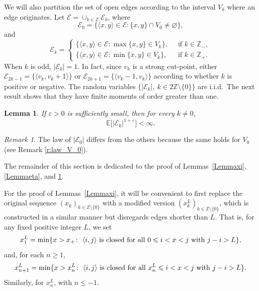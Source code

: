 \documentclass[a4paper,oneside,12pt]{amsart}
\renewcommand{\leq}{\leqslant}
\renewcommand{\geq}{\geqslant}
\newcommand{\E}{\mathbb{E}}
\theoremstyle{plain}
\newtheorem{lemma}{Lemma}
\theoremstyle{definition}
\theoremstyle{remark}
\newtheorem{remark}{Remark}
\newcommand{\Z}{{\mathbb{Z}}}
\begin{document}
We will also partition the set of open edges according to the interval $V_k$ where an edge originates.
Let $\mathcal{E} = \cup_{k \in \Z} \mathcal{E}_{k}$, where 
\[
\mathcal{E}_0 = \big\{ \langle x,y \rangle \in \mathcal{E} \colon \{x,y\} \cap V_0 \neq \varnothing \big\},
\]
and
\begin{equation*}
\mathcal{E}_{k} = \begin{cases} 
\bigl\{ \langle x,y \rangle \in \mathcal{E} \colon \max\{x,y\} \in V_{k} \bigr\}, &~\textrm{ if } k \in \Z_-,\\
\big\{ \langle x,y \rangle \in \mathcal{E} \colon \min\{x,y\} \in V_{k} \big\}, &~\textrm{ if } k \in \Z_+.
\end{cases}
\end{equation*}
When $k$ is odd, $|\mathcal{E}_k| =1$. 
In fact, since $v_k$ is a strong cut-point, either $\mathcal{E}_{2k-1} = \{\langle v_k, v_k + 1 \rangle \}$ or $\mathcal{E}_{2k+1} = \{\langle v_k - 1, v_k \rangle \}$ according to whether $k$ is  positive or negative.
The random variables $\{|\mathcal{E}_k|, ~ k\in 2\mathbb{Z} \setminus \{0\}  \}$ are i.i.d.\
The next result shows that they have finite moments of order greater than one. 
\begin{lemma}
\label{l:expectation_ek} 
If $\varepsilon>0$ is sufficiently small, then for every $k\neq 0$, 
\[\E\Big[\left\vert\mathcal{E}_k \right\vert^{1+\varepsilon}\Big] < \infty.\]
\end{lemma}

\begin{remark}
The law of $|\mathcal{E}_0|$ differs from the others because the same holds for $V_0$ (see Remark \ref{r:law_V_0}).
\end{remark}

The remainder of this section is dedicated to the proof of Lemmas~\ref{Lemmaxi}, \ref{Lemmaeta}, and \ref{l:expectation_ek}.
\medskip

For the proof of Lemmas~\ref{Lemmaxi}, it will be convenient to first replace the original sequence $(x_k)_{k \in \mathbb{Z} \setminus \{0\}}$ with a modified version $(x_k^L)_{k \in \mathbb{Z} \setminus \{0\}}$, which is constructed in a similar manner but disregards edges shorter than $L$.
That is, for any fixed positive integer $L$, we set
\begin{equation*}
x_{1}^L = \min\{ x > x_+ \colon \textrm{ $\langle i,j  \rangle$ is closed for all $ 0 \leq i < x <  j$ with $j-i > L$}\}, 
\end{equation*}
and, for each $n \geq 1$,
\begin{equation*} 
x_{n+1}^L = \min\{ x > x_n^L \colon \textrm{ $\langle i,j  \rangle$ is closed for all $ x_n^L \leq i < x <  j$ with $j-i > L$}\}.
\end{equation*}
Similarly, for $x_{n}^L$, with $n \leq -1$.
\end{document}
